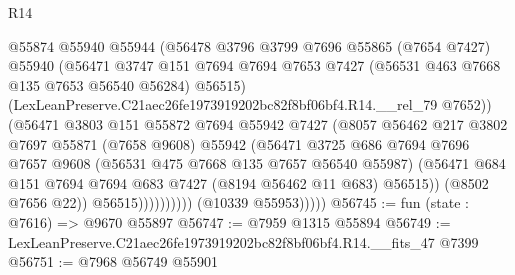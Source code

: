 \begin{lexlean}{R14}
\begin{coremodule}
                              @55874
                              @55940
                              @55944
                              (@56478
                                @3796
                                @3799
                                @7696
                                @55865
                                (@7654 @7427)
                                @55940
                                (@56471
                                  @3747
                                  @151
                                  @7694
                                  @7694
                                  @7653
                                  @7427
                                  (@56531 @463 @7668 @135 @7653 @56540 @56284)
                                  @56515)
                                (LexLeanPreserve.C21aec26fe1973919202bc82f8bf06bf4.R14.__rel_79
                                  @7652))
                              (@56471
                                @3803
                                @151
                                @55872
                                @7694
                                @55942
                                @7427
                                (@8057
                                  @56462
                                  @217
                                  @3802
                                  @7697
                                  @55871
                                  (@7658 @9608)
                                  @55942
                                  (@56471
                                    @3725
                                    @686
                                    @7694
                                    @7696
                                    @7657
                                    @9608
                                    (@56531 @475 @7668 @135 @7657 @56540 @55987)
                                    (@56471
                                      @684
                                      @151
                                      @7694
                                      @7694
                                      @683
                                      @7427
                                      (@8194 @56462 @11 @683)
                                      @56515))
                                  (@8502 @7656 @22))
                                @56515))))))))))
            (@10339 @55953)))))
@56745 := fun (state : @7616) => @9670 @55897
@56747 := @7959 @1315 @55894
@56749 := LexLeanPreserve.C21aec26fe1973919202bc82f8bf06bf4.R14.__fits_47 @7399
@56751 := @7968 @56749 @55901

\end{coremodule}
\end{lexlean}
